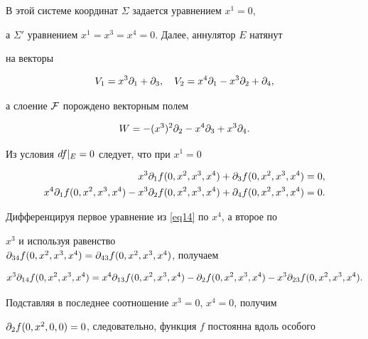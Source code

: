 \begin{pf}
В этой системе координат $\Sigma$ задается уравнением $x^1=0$,


а $\Sigma'$ уравнением $x^1=x^3=x^4=0$. Далее, аннулятор $E$ натянут


на векторы


\begin{equation}


\label{eq11}


V_1 = x^3\pd_1 + \pd_3, \quad V_2 = x^4\pd_1 - x^3\pd_2 +\pd_4,


\end{equation}


а слоение $\cal F$ порождено векторным полем


$$


W = -(x^3)^2\pd_2 - x^4\pd_3 + x^3\pd_4.


$$


Из условия $df |_{E}=0$ следует, что при $x^1=0$


\begin{equation}


\label{eq14}


\begin{split}


x^3 \pd_1 f(0,x^2,x^3,x^4) + \pd_3 f(0,x^2,x^3,x^4) &= 0,


\\


x^4 \pd_1 f(0,x^2,x^3,x^4) - x^3 \pd_2 f(0,x^2,x^3,x^4) + \pd_4


f(0,x^2,x^3,x^4) &= 0.


\end{split}


\end{equation}


Дифференцируя первое уравнение из \eqref{eq14} по $x^4$, а второе по


$x^3$ и используя равенство\\ $\pd_{34}f(0,x^2,x^3,x^4) =


\pd_{43}f(0,x^2,x^3,x^4)$, получаем


$$


x^3 \pd_{14} f(0,x^2,x^3,x^4) = x^4 \pd_{13} f(0,x^2,x^3,x^4) -


\pd_2 f(0,x^2,x^3,x^4) - x^3 \pd_{23} f(0,x^2,x^3,x^4).


$$


Подставляя в последнее соотношение $x^3=0$, $x^4=0$, получим


${\partial}_2 f(0,x^2,0,0) = 0$, следовательно, функция $f$ постоянна вдоль особого



\end{pf}
